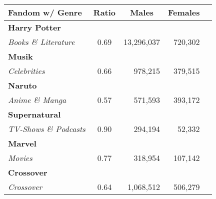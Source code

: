 \begin{table}[htb]
    \centering
    \begin{tabular}{lcrrr}
        \toprule
        \textbf{Fandom w/ Genre} &
        \multicolumn{1}{c}{\textbf{Ratio}} &
        \multicolumn{1}{c}{\textbf{Males}} &
        \multicolumn{1}{c}{\textbf{Females}} \\
        \midrule
        \textbf{Harry Potter}       & \cellcolor[HTML]{96b7ed}                       &                              &                           \\
        \emph{Books \& Literature}  & \multirow{-2}{*}{\cellcolor[HTML]{96b7ed}0.69} & \multirow{-2}{*}{13,296,037} & \multirow{-2}{*}{720,302} \\
        \addlinespace[.2em]
        \textbf{Musik}              & \cellcolor[HTML]{a3c0f0}                       &                              &                           \\
        \emph{Celebrities}          & \multirow{-2}{*}{\cellcolor[HTML]{a3c0f0}0.66} & \multirow{-2}{*}{978,215}    & \multirow{-2}{*}{379,515} \\
        \addlinespace[.2em]
        \textbf{Naruto}             & \cellcolor[HTML]{c9daf8}                       &                              &                           \\
        \emph{Anime \& Manga}       & \multirow{-2}{*}{\cellcolor[HTML]{c9daf8}0.57} & \multirow{-2}{*}{571,593}    & \multirow{-2}{*}{393,172} \\
        \addlinespace[.2em]
        \textbf{Supernatural}       & \cellcolor[HTML]{3c78d8}                       &                              &                           \\
        \emph{TV-Shows \& Podcasts} & \multirow{-2}{*}{\cellcolor[HTML]{3c78d8}0.90} & \multirow{-2}{*}{294,194}    & \multirow{-2}{*}{52,332}  \\
        \addlinespace[.2em]
        \textbf{Marvel}             & \cellcolor[HTML]{749fe5}                       &                              &                           \\
        \emph{Movies}               & \multirow{-2}{*}{\cellcolor[HTML]{749fe5}0.77} & \multirow{-2}{*}{318,954}    & \multirow{-2}{*}{107,142} \\
        \addlinespace[.2em]
        \textbf{Crossover}          & \cellcolor[HTML]{acc6f2}                       &                              &                           \\
        \emph{Crossover}            & \multirow{-2}{*}{\cellcolor[HTML]{acc6f2}0.64} & \multirow{-2}{*}{1,068,512}  & \multirow{-2}{*}{506,279} \\

\end{tabular}
\end{table}
